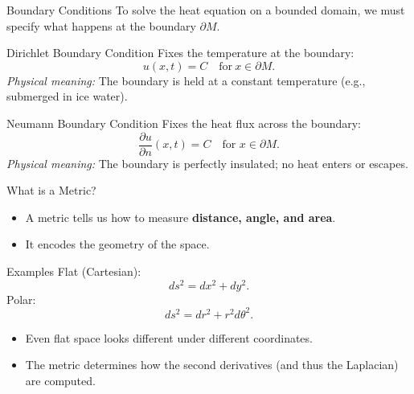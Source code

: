 \documentclass[aspectratio=1610,10pt]{beamer}
\begin{document}
  \begin{frame}{Boundary Conditions}
    To solve the heat equation on a bounded domain, we must specify what happens at the boundary $\partial M$.
    \vspace{0.5cm}

    \pause
    \begin{block}{Dirichlet Boundary Condition}
      Fixes the temperature at the boundary:
      \[%
        u(x,t) = C \quad \text{for}~x \in \partial M
      .\]%
      \emph{Physical meaning:} The boundary is held at a constant temperature (e.g., submerged in ice water).
    \end{block}

    \pause
    \begin{block}{Neumann Boundary Condition}
      Fixes the heat flux across the boundary:
      \[%
        \frac{\partial u}{\partial n}(x,t) = C \quad \text{for } x \in \partial M
      .\]%
      \emph{Physical meaning:} The boundary is perfectly insulated; no heat enters or escapes.
    \end{block}
  \end{frame}

  \begin{frame}{What is a Metric?}
    \begin{itemize}
      \item A metric tells us how to measure \textbf{distance, angle, and area}.
      \item It encodes the geometry of the space.
    \end{itemize}

    \begin{block}{Examples}
      Flat (Cartesian):
      \[%
        ds^2 = dx^2 + dy^2
      .\]%
      Polar:
      \[%
        ds^2 = dr^2 + r^2 d\theta^2
      .\]%
    \end{block}
    \begin{itemize}
      \item Even flat space looks different under different coordinates.
      \item The metric determines how the second derivatives (and thus the Laplacian) are computed.
    \end{itemize}
  \end{frame}
\end{document}

